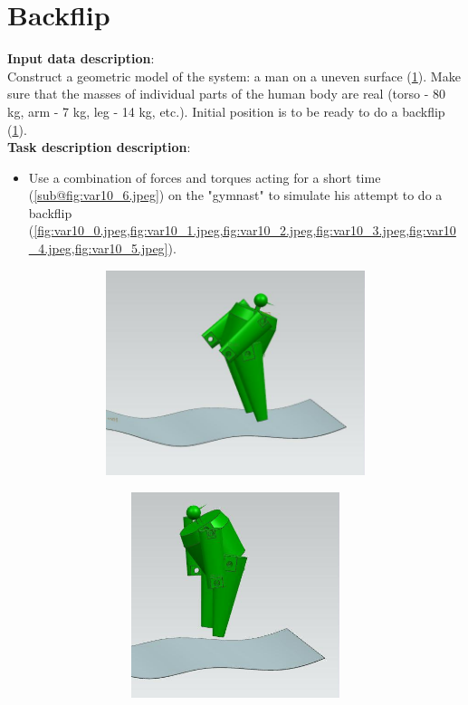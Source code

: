 \documentclass[12pt]{article}
\newcommand\ttask[3] 
 {
	\section*{#1}
	\textbf{Input data description}: \\ #2 \  \\
	\textbf{Task description description}: #3
	\newpage
 }
\begin{document}
\ttask{Backflip}{
	Construct a geometric model of the system: a man on a uneven surface (\cref{fig:var10_0.jpeg}). Make sure that the masses of individual parts of the human body are real (torso - 80 kg, arm - 7 kg, leg - 14 kg, etc.). Initial position is to be ready to do a backflip (\cref{fig:var10_0.jpeg}).
}{
	\begin{itemize}
		\item Use a combination of forces and torques acting for a short time (\cref{sub@fig:var10_6.jpeg}) on the "gymnast" to simulate his attempt to do a backflip (\cref{fig:var10_0.jpeg,fig:var10_1.jpeg,fig:var10_2.jpeg,fig:var10_3.jpeg,fig:var10_4.jpeg,fig:var10_5.jpeg}).
	\end{itemize}

	\begin{figure}[H]
		\begin{subfigure}{0.32\textwidth}
			\centering\includegraphics[height=6cm,width=1\textwidth,keepaspectratio]{var10_0.jpeg}
			\caption{}
			\label{fig:var10_0.jpeg}
		\end{subfigure}
		\begin{subfigure}{0.32\textwidth}
			\centering\includegraphics[height=6cm,width=1\textwidth,keepaspectratio]{var10_1.jpeg}
			\caption{}
			\label{fig:var10_1.jpeg}
		\end{subfigure}
		\begin{subfigure}{0.32\textwidth}

\end{subfigure}
\end{figure}}
\end{document}
